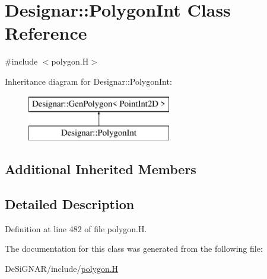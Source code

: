 \hypertarget{class_designar_1_1_polygon_int}{}\section{Designar\+:\+:Polygon\+Int Class Reference}
\label{class_designar_1_1_polygon_int}


{\ttfamily \#include $<$polygon.\+H$>$}

Inheritance diagram for Designar\+:\+:Polygon\+Int\+:\begin{figure}[H]
\begin{center}
\leavevmode
\includegraphics[height=2.000000cm]{class_designar_1_1_polygon_int}
\end{center}
\end{figure}
\subsection*{Additional Inherited Members}


\subsection{Detailed Description}


Definition at line 482 of file polygon.\+H.



The documentation for this class was generated from the following file\+:\begin{DoxyCompactItemize}
\item 
De\+Si\+G\+N\+A\+R/include/\hyperlink{polygon_8_h}{polygon.\+H}\end{DoxyCompactItemize}

